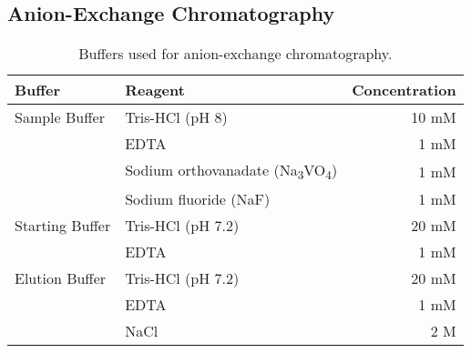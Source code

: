 \subsection{Anion-Exchange Chromatography}
\bigskip
\begin{table}[H]
\begin{center}
\captionsetup{justification=centering}
\caption[Anion-Exchange Chromatography Buffers]{Buffers used for anion-exchange chromatography.}
\vspace{.5cm}
\begin{tabular}{l l r}
\hline
\label{AEX buffers}
\textbf{Buffer} & \textbf{Reagent} & \textbf{Concentration}\Tstrut\Bstrut\\
\hline
Sample Buffer & Tris-HCl (pH 8) & 10 mM\\
& EDTA & 1 mM\\
& Sodium orthovanadate (Na\textsubscript{3}VO\textsubscript{4}) & 1 mM\\
& Sodium fluoride (NaF) & 1 mM\\ [0.3 cm]

Starting Buffer & Tris-HCl (pH 7.2) & 20 mM\\ 
& EDTA & 1 mM\\ [0.3 cm]

Elution Buffer & Tris-HCl (pH 7.2) & 20 mM\\
& EDTA & 1 mM\\
& NaCl & 2 M\\[.8ex]
\hline 
\end{tabular}
\end{center}
\end{table}







